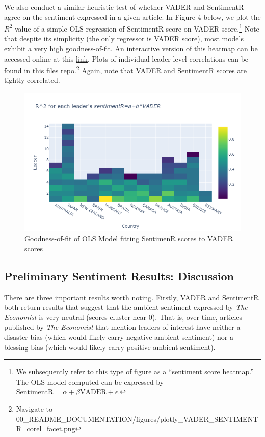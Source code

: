 \documentclass[11pt, letterpaper, twoside]{article}
\begin{document}
We also conduct a similar heuristic test of whether VADER and SentimentR agree on the sentiment expressed in a given article. In Figure 4 below, we plot the $R^2$ value of a simple OLS regression of SentimentR score on VADER score.\footnote{We subsequently refer to this type of figure as a ``sentiment score heatmap.'' The OLS model computed can be expressed by $\text{SentimentR} = \alpha +\beta \text{VADER} +\epsilon$. } Note that despite its simplicity (the only regressor is VADER score), most models exhibit a very high goodness-of-fit. An interactive version of this heatmap can be accessed online at this \href{https://chart-studio.plotly.com/~jyl63/101/#/}{link}. Plots of individual leader-level correlations can be found in this files repo.\footnote{Navigate to 00\_README\_DOCUMENTATION/figures/plotly\_VADER\_SENTIMENTR\_corel\_facet.png} Again, note that VADER and SentimentR scores are tightly correlated.

\begin{figure}
    \caption{Goodness-of-fit of OLS Model fitting SentimenR scores to VADER scores}
    \centering
    \includegraphics[clip, width=\textwidth]{figures/plotly_VADER_SENTIMENTR_rsquared_heatmap.png}
\end{figure}

\subsection{Preliminary Sentiment Results: Discussion}
There are three  important results worth noting. Firstly, VADER and SentimentR both return results that suggest that the ambient sentiment expressed by \textit{The Economist} is very neutral (scores cluster near 0). That is, over time, articles published by \textit{The Economist} that mention leaders of interest have neither a disaster-bias (which would likely carry negative ambient sentiment) nor a blessing-bias (which would likely carry positive ambient sentiment).\\
\end{document}
